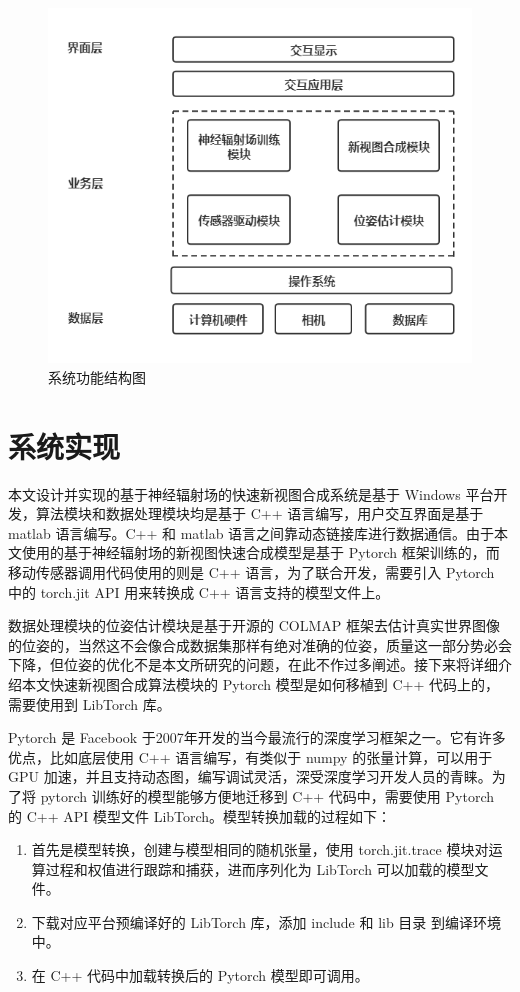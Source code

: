\begin{figure}[htbp]
	\centering
	\includegraphics[width=0.75\linewidth]{figures/system_design_revised.png}
	\caption{系统功能结构图}
	\label{fig:symtem_design}
\end{figure}

\section{系统实现}
本文设计并实现的基于神经辐射场的快速新视图合成系统是基于 Windows 平台开发，算法模块和数据处理模块均是基于 C++ 语言编写，用户交互界面是基于 matlab 语言编写。C++ 和 matlab 语言之间靠动态链接库进行数据通信。由于本文使用的基于神经辐射场的新视图快速合成模型是基于 Pytorch 框架训练的，而移动传感器调用代码使用的则是 C++ 语言，为了联合开发，需要引入 Pytorch 中的 torch.jit API 用来转换成 C++ 语言支持的模型文件上。

数据处理模块的位姿估计模块是基于开源的 COLMAP 框架去估计真实世界图像的位姿的，当然这不会像合成数据集那样有绝对准确的位姿，质量这一部分势必会下降，但位姿的优化不是本文所研究的问题，在此不作过多阐述。接下来将详细介绍本文快速新视图合成算法模块的 Pytorch 模型是如何移植到 C++ 代码上的，需要使用到 LibTorch 库。

Pytorch 是 Facebook 于2007年开发的当今最流行的深度学习框架之一。它有许多优点，比如底层使用 C++ 语言编写，有类似于 numpy 的张量计算，可以用于 GPU 加速，并且支持动态图，编写调试灵活，深受深度学习开发人员的青睐。为了将 pytorch 训练好的模型能够方便地迁移到 C++ 代码中，需要使用 Pytorch 的 C++ API 模型文件 LibTorch。模型转换加载的过程如下： 

\begin{enumerate}
    \item 首先是模型转换，创建与模型相同的随机张量，使用 torch.jit.trace 模块对运算过程和权值进行跟踪和捕获，进而序列化为 LibTorch 可以加载的模型文件。
    \item 下载对应平台预编译好的 LibTorch 库，添加 include 和 lib 目录
到编译环境中。
    \item 在 C++ 代码中加载转换后的 Pytorch 模型即可调用。 
\end{enumerate}

